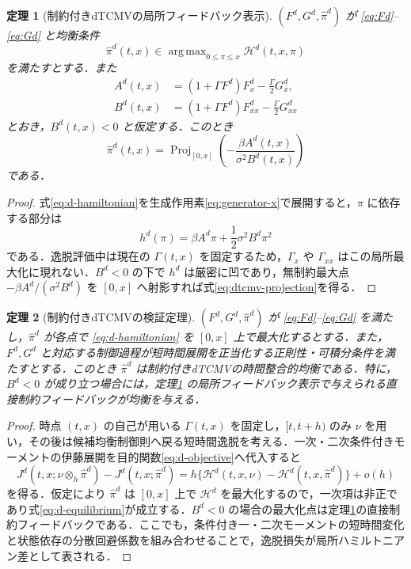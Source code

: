 \documentclass[10pt,a4paper]{article}
\theoremstyle{plain}
\newtheorem{theorem}{定理}
\theoremstyle{definition}
\DeclareMathOperator{\Proj}{Proj}
\DeclareMathOperator*{\argmax}{arg\,max}
\newcommand{\Hamil}{\mathcal{H}}
\begin{document}
\begin{theorem}[制約付きdTCMVの局所フィードバック表示]
\label{thm:dtcmv-projection}
$(F^d,G^d,\hat\pi^d)$ が \eqref{eq:Fd}--\eqref{eq:Gd} と均衡条件
\begin{equation}
  \hat\pi^d(t,x)\in\argmax_{0\leq\pi\leq x}\Hamil^d(t,x,\pi)
  \label{eq:d-argmax}
\end{equation}
を満たすとする．また
\begin{align}
  A^d(t,x)&=(1+\Gamma F^d)F_x^d-\frac{\Gamma}{2}G_x^d,
  \label{eq:Ad}\\
  B^d(t,x)&=(1+\Gamma F^d)F_{xx}^d-\frac{\Gamma}{2}G_{xx}^d
  \label{eq:Bd}
\end{align}
とおき，$B^d(t,x)<0$ と仮定する．このとき
\begin{equation}
  \boxed{
  \hat\pi^d(t,x)=
  \Proj_{[0,x]}
  \left(
  -\frac{\beta A^d(t,x)}{\sigma^2B^d(t,x)}
  \right)
  }
  \label{eq:dtcmv-projection}
\end{equation}
である．
\end{theorem}

\begin{proof}
式\eqref{eq:d-hamiltonian}を生成作用素\eqref{eq:generator-x}で展開すると，$\pi$ に依存する部分は
\[
 h^d(\pi)=\beta A^d\pi+\frac12\sigma^2B^d\pi^2
\]
である．逸脱評価中は現在の $\Gamma(t,x)$ を固定するため，$\Gamma_x$ や $\Gamma_{xx}$ はこの局所最大化に現れない．$B^d<0$ の下で $h^d$ は厳密に凹であり，無制約最大点 $-\beta A^d/(\sigma^2B^d)$ を $[0,x]$ へ射影すれば式\eqref{eq:dtcmv-projection}を得る．
\end{proof}

\begin{theorem}[制約付きdTCMVの検証定理]
\label{thm:dtcmv-verification}
$(F^d,G^d,\hat\pi^d)$ が \eqref{eq:Fd}--\eqref{eq:Gd} を満たし，$\hat\pi^d$ が各点で \eqref{eq:d-hamiltonian} を $[0,x]$ 上で最大化するとする．また，$F^d,G^d$ と対応する制御過程が短時間展開を正当化する正則性・可積分条件を満たすとする．このとき $\hat\pi^d$ は制約付きdTCMVの時間整合的均衡である．特に，$B^d<0$ が成り立つ場合には，定理\ref{thm:dtcmv-projection} の局所フィードバック表示で与えられる直接制約フィードバックが均衡を与える．
\end{theorem}

\begin{proof}
時点 $(t,x)$ の自己が用いる $\Gamma(t,x)$ を固定し，$[t,t+h)$ のみ $\nu$ を用い，その後は候補均衡制御則へ戻る短時間逸脱を考える．一次・二次条件付きモーメントの伊藤展開を目的関数\eqref{eq:d-objective}へ代入すると
\[
 J^d(t,x;\nu\otimes_h\hat\pi^d)-J^d(t,x;\hat\pi^d)
 =h\{\Hamil^d(t,x,\nu)-\Hamil^d(t,x,\hat\pi^d)\}+o(h)
\]
を得る．仮定により $\hat\pi^d$ は $[0,x]$ 上で $\Hamil^d$ を最大化するので，一次項は非正であり式\eqref{eq:d-equilibrium}が成立する．$B^d<0$ の場合の最大化点は定理\ref{thm:dtcmv-projection}の直接制約フィードバックである．ここでも，条件付き一・二次モーメントの短時間変化と状態依存の分散回避係数を組み合わせることで，逸脱損失が局所ハミルトニアン差として表される．
\end{proof}
\end{document}
